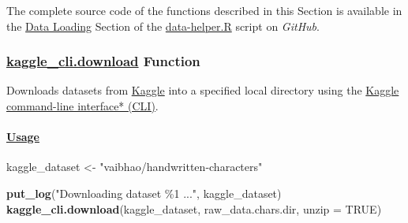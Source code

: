 \documentclass[
]{report}
\newenvironment{Shaded}{\begin{snugshade}}{\end{snugshade}}
\newcommand{\AttributeTok}[1]{\textcolor[rgb]{0.13,0.29,0.53}{#1}}
\newcommand{\ConstantTok}[1]{\textcolor[rgb]{0.56,0.35,0.01}{#1}}
\newcommand{\FunctionTok}[1]{\textcolor[rgb]{0.13,0.29,0.53}{\textbf{#1}}}
\newcommand{\NormalTok}[1]{#1}
\newcommand{\OtherTok}[1]{\textcolor[rgb]{0.56,0.35,0.01}{#1}}
\newcommand{\StringTok}[1]{\textcolor[rgb]{0.31,0.60,0.02}{#1}}
\begin{document}
\begin{noteblock}
The complete source code of the functions described in this Section is available in the \href{https://github.com/AzKurban-edX-DS/edx.capstone.choose-your-own/tree/main/r/support-functions/data-helper.R\#L5-L419}{Data Loading} Section of the \href{https://github.com/AzKurban-edX-DS/edx.capstone.choose-your-own/tree/main/r/support-functions/data-helper.R\#L5-L419}{data-helper.R} script on \emph{GitHub}.

\end{noteblock}

\subsubsection{\texorpdfstring{\href{https://github.com/AzKurban-edX-DS/edx.capstone.choose-your-own/blob/main/r/support-functions/data-helper.R\#L}{kaggle\_cli.download} Function}{kaggle\_cli.download Function}}\label{func.kaggle_cli.download}

\hfill\break

Downloads datasets from \href{https://www.kaggle.com/datasets}{Kaggle} into a specified local directory using the \href{https://github.com/Kaggle/kaggle-cli/blob/main/docs/datasets.md\#kaggle-datasets-download}{Kaggle command-line interface* (CLI)}.

\newpage

\protect{}\label{func.kaggle_cli.download.usage}
\paragraph{\texorpdfstring{\href{https://github.com/AzKurban-edX-DS/edx.capstone.choose-your-own/blob/main/r/support-scripts/ds.kaggle.download.R\#L16}{Usage}}{Usage}}\label{usage}

\hfill\break

\begin{Shaded}
\begin{Highlighting}[]
\NormalTok{kaggle\_dataset }\OtherTok{\textless{}{-}} \StringTok{"vaibhao/handwritten{-}characters"}

  \FunctionTok{put\_log}\NormalTok{(}\StringTok{"Downloading dataset \textasciigrave{}\%1\textasciigrave{} ..."}\NormalTok{, kaggle\_dataset)}
  \FunctionTok{kaggle\_cli.download}\NormalTok{(kaggle\_dataset, raw\_data.chars.dir, }\AttributeTok{unzip =} \ConstantTok{TRUE}\NormalTok{)}
\end{Highlighting}
\end{Shaded}
\end{document}
